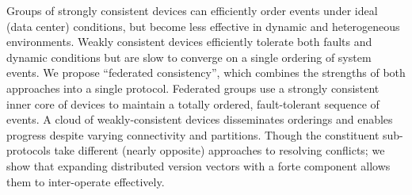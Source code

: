 Groups of strongly consistent devices can efficiently order events under ideal (data
center) conditions, but become less effective in dynamic and heterogeneous environments.
Weakly consistent devices efficiently tolerate both faults and dynamic conditions but are
slow to converge on a single ordering of system events.
We propose “federated consistency”, which combines the strengths of both approaches into
a single protocol.
Federated groups use a strongly consistent inner core of devices to maintain a totally
ordered, fault-tolerant sequence of events.
A cloud of weakly-consistent devices disseminates orderings and enables progress despite
varying connectivity and partitions.
Though the constituent sub-protocols take different (nearly opposite) approaches to
resolving conflicts; we show that expanding distributed version vectors with a forte
component allows them to inter-operate effectively.
